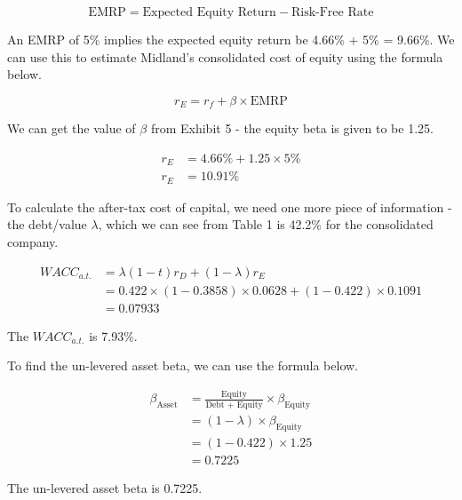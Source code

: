\documentclass[letterpaper]{article}
\begin{document}
\[
\text{EMRP} = \text{Expected Equity Return} - \text{Risk-Free Rate}
\]

An EMRP of 5\% implies the expected equity return be 4.66\% + 5\% = 9.66\%. We can use this to estimate Midland's consolidated cost of equity using the formula below.

\[
r_E = r_f + \beta \times \text{EMRP}
\]

We can get the value of $\beta$ from Exhibit 5 - the equity beta is given to be 1.25.

\begin{align*}
r_E &= 4.66\% + 1.25 \times 5\% \\
r_E &= 10.91\%
\end{align*}

To calculate the after-tax cost of capital, we need one more piece of information - the debt/value $\lambda$, which we can see from Table 1 is 42.2\% for the consolidated company.

\begin{align*}
WACC_{a.t.} &= \lambda (1-t) r_D + (1-\lambda)r_E \\
            &= 0.422 \times (1 - 0.3858) \times 0.0628 + (1 - 0.422) \times 0.1091 \\
            &= 0.07933
\end{align*}

The $WACC_{a.t.}$ is 7.93\%.

To find the un-levered asset beta, we can use the formula below.

\begin{align*}
\beta_{\text{Asset}} &= \frac{\text{Equity}}{\text{Debt + Equity}}\times \beta_{\text{Equity}} \\
                    &= (1 - \lambda) \times \beta_{\text{Equity}} \\
                    &= (1 - 0.422) \times 1.25 \\
                    &= 0.7225
\end{align*}

The un-levered asset beta is 0.7225.
\end{document}
